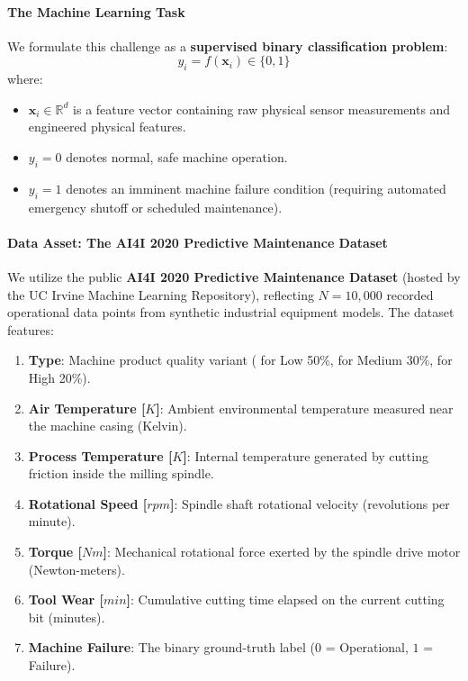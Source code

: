 \paragraph{The Machine Learning Task}
We formulate this challenge as a \textbf{supervised binary classification problem}:
\begin{equation}
y_i = f(\mathbf{x}_i) \in \{0, 1\}\label{eq:classification_goal}
\end{equation}
where:
\begin{itemize}
    \item $\mathbf{x}_i \in \mathbb{R}^d$ is a feature vector containing raw physical sensor measurements and engineered physical features.
    \item $y_i = 0$ denotes normal, safe machine operation.
    \item $y_i = 1$ denotes an imminent machine failure condition (requiring automated emergency shutoff or scheduled maintenance).
\end{itemize}

\paragraph{Data Asset: The AI4I 2020 Predictive Maintenance Dataset}
We utilize the public \textbf{AI4I 2020 Predictive Maintenance Dataset} (hosted by the UC Irvine Machine Learning Repository), reflecting $N = 10{,}000$ recorded operational data points from synthetic industrial equipment models. The dataset features:
\begin{enumerate}
    \item \textbf{Type}: Machine product quality variant ( for Low 50\%,  for Medium 30\%,  for High 20\%).
    \item \textbf{Air Temperature [$K$]}: Ambient environmental temperature measured near the machine casing (Kelvin).
    \item \textbf{Process Temperature [$K$]}: Internal temperature generated by cutting friction inside the milling spindle.
    \item \textbf{Rotational Speed [$rpm$]}: Spindle shaft rotational velocity (revolutions per minute).
    \item \textbf{Torque [$Nm$]}: Mechanical rotational force exerted by the spindle drive motor (Newton-meters).
    \item \textbf{Tool Wear [$min$]}: Cumulative cutting time elapsed on the current cutting bit (minutes).
    \item \textbf{Machine Failure}: The binary ground-truth label ($0$ = Operational, $1$ = Failure).
\end{enumerate}

